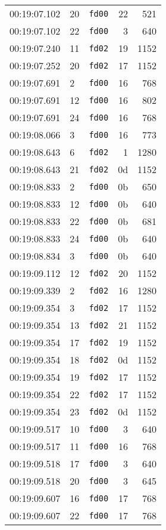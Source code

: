 \documentclass{article}
\begin{document}
\begin{longtable}{lllrr}
00:19:07.102 & 20 & \texttt{fd00} & 22 & 521 \\
00:19:07.102 & 22 & \texttt{fd00} & 3 & 640 \\
00:19:07.240 & 11 & \texttt{fd02} & 19 & 1152 \\
00:19:07.252 & 20 & \texttt{fd02} & 17 & 1152 \\
00:19:07.691 & 2 & \texttt{fd00} & 16 & 768 \\
00:19:07.691 & 12 & \texttt{fd00} & 16 & 802 \\
00:19:07.691 & 24 & \texttt{fd00} & 16 & 768 \\
00:19:08.066 & 3 & \texttt{fd00} & 16 & 773 \\
00:19:08.643 & 6 & \texttt{fd02} & 1 & 1280 \\
00:19:08.643 & 21 & \texttt{fd02} & 0d & 1152 \\
00:19:08.833 & 2 & \texttt{fd00} & 0b & 650 \\
00:19:08.833 & 12 & \texttt{fd00} & 0b & 640 \\
00:19:08.833 & 22 & \texttt{fd00} & 0b & 681 \\
00:19:08.833 & 24 & \texttt{fd00} & 0b & 640 \\
00:19:08.834 & 3 & \texttt{fd00} & 0b & 640 \\
00:19:09.112 & 12 & \texttt{fd02} & 20 & 1152 \\
00:19:09.339 & 2 & \texttt{fd02} & 16 & 1280 \\
00:19:09.354 & 3 & \texttt{fd02} & 17 & 1152 \\
00:19:09.354 & 13 & \texttt{fd02} & 21 & 1152 \\
00:19:09.354 & 17 & \texttt{fd02} & 19 & 1152 \\
00:19:09.354 & 18 & \texttt{fd02} & 0d & 1152 \\
00:19:09.354 & 19 & \texttt{fd02} & 17 & 1152 \\
00:19:09.354 & 22 & \texttt{fd02} & 17 & 1152 \\
00:19:09.354 & 23 & \texttt{fd02} & 0d & 1152 \\
00:19:09.517 & 10 & \texttt{fd00} & 3 & 640 \\
00:19:09.517 & 11 & \texttt{fd00} & 16 & 768 \\
00:19:09.518 & 17 & \texttt{fd00} & 3 & 640 \\
00:19:09.518 & 20 & \texttt{fd00} & 3 & 645 \\
00:19:09.607 & 16 & \texttt{fd00} & 17 & 768 \\
00:19:09.607 & 22 & \texttt{fd00} & 17 & 768 \\

\end{longtable}
\end{document}
